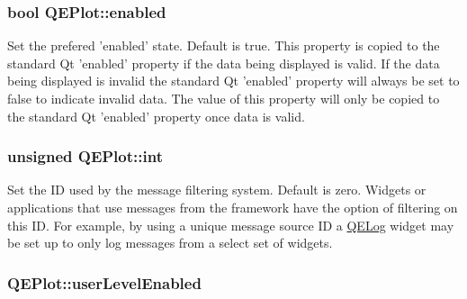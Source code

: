\hypertarget{classQEPlot_a3bce665d50cf4c8ead83b0f7b914e497}{
\subsubsection[{enabled}]{\setlength{\rightskip}{0pt plus 5cm}bool QEPlot::enabled}}
\label{classQEPlot_a3bce665d50cf4c8ead83b0f7b914e497}
Set the prefered 'enabled' state. Default is true. This property is copied to the standard Qt 'enabled' property if the data being displayed is valid. If the data being displayed is invalid the standard Qt 'enabled' property will always be set to false to indicate invalid data. The value of this property will only be copied to the standard Qt 'enabled' property once data is valid. \hypertarget{classQEPlot_a81aaae8a82c382a2ad61aa2990671c1e}{
\subsubsection[{int}]{\setlength{\rightskip}{0pt plus 5cm}unsigned QEPlot::int}}
\label{classQEPlot_a81aaae8a82c382a2ad61aa2990671c1e}
Set the ID used by the message filtering system. Default is zero. Widgets or applications that use messages from the framework have the option of filtering on this ID. For example, by using a unique message source ID a \hyperlink{classQELog}{QELog} widget may be set up to only log messages from a select set of widgets. \hypertarget{classQEPlot_acd90a1dd927f697ad58a888a748cff07}{
\subsubsection[{userLevelEnabled}]{ QEPlot::userLevelEnabled}}
\label{classQEPlot_acd90a1dd927f697ad58a888a748cff07}
